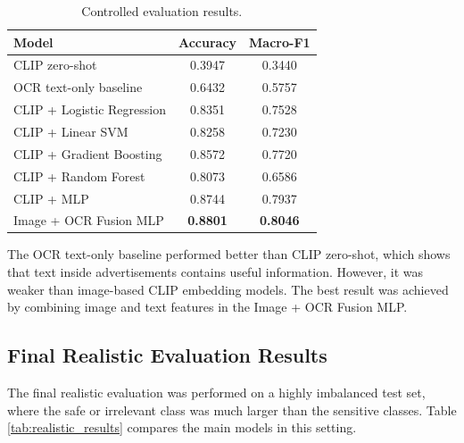 \documentclass[12pt]{article}
\begin{document}
\begin{table}[H]
\centering
\begin{tabular}{lcc}
\toprule
\textbf{Model} & \textbf{Accuracy} & \textbf{Macro-F1} \\
\midrule
CLIP zero-shot & 0.3947 & 0.3440 \\
OCR text-only baseline & 0.6432 & 0.5757 \\
CLIP + Logistic Regression & 0.8351 & 0.7528 \\
CLIP + Linear SVM & 0.8258 & 0.7230 \\
CLIP + Gradient Boosting & 0.8572 & 0.7720 \\
CLIP + Random Forest & 0.8073 & 0.6586 \\
CLIP + MLP & 0.8744 & 0.7937 \\
Image + OCR Fusion MLP & \textbf{0.8801} & \textbf{0.8046} \\
\bottomrule
\end{tabular}
\caption{Controlled evaluation results.}
\label{tab:controlled_results}
\end{table}

The OCR text-only baseline performed better than CLIP zero-shot, which shows that text inside advertisements contains useful information. However, it was weaker than image-based CLIP embedding models. The best result was achieved by combining image and text features in the Image + OCR Fusion MLP.

\subsection{Final Realistic Evaluation Results}

The final realistic evaluation was performed on a highly imbalanced test set, where the safe or irrelevant class was much larger than the sensitive classes. Table \ref{tab:realistic_results} compares the main models in this setting.
\end{document}
